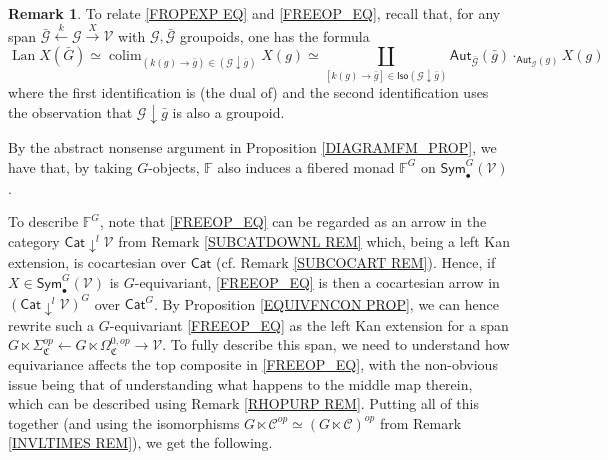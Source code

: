 \documentclass[a4paper,10pt
,draft
]{article}%
\numberwithin{equation}{section}
\numberwithin{figure}{section}
\theoremstyle{definition} %
\newtheorem{remark}[equation]{Remark}%
\DeclareMathOperator{\colim}{colim}%
\DeclareMathOperator{\Lan}{Lan}%
\newcommand{\V}{\ensuremath{\mathcal V}}
\newcommand{\1}{\ensuremath{\mathbbm 1}}%
\begin{document}
\begin{remark}\label{CONVER REM}
	To relate \eqref{FROPEXP EQ} and \eqref{FREEOP_EQ}, recall that, 
	for any span 
	$\bar{\mathcal{G}} \overset{k}{\leftarrow} \mathcal{G} \xrightarrow{X} \mathcal{V}$
	with $\mathcal{G},\bar{\mathcal{G}}$ groupoids,
	one has the formula
	\[\Lan X (\bar{G}) \simeq 
	\colim_{(k(g) \to \bar{g})\in (\mathcal{G} \downarrow \bar{g})} X(g) \simeq
	\coprod_{[k(g) \to \bar{g}] 
		\in \mathsf{Iso}(\mathcal{G} \downarrow \bar{g})}
	\mathsf{Aut}_{\bar{\mathcal{G}}}(\bar{g})
	\cdot_{\mathsf{Aut}_{\mathcal{G}}(g)}
	X(g)
	\]
	where the first identification is
	(the dual of) \cite[Thm. 1.3.5]{Ri14}
	and the second identification uses the observation that
	$\mathcal{G} \downarrow \bar{g}$ is also a groupoid.
\end{remark}


By the abstract nonsense argument in 
Proposition \ref{DIAGRAMFM_PROP},
we have that, by taking $G$-objects, 
$\mathbb{F}$ also induces a fibered monad 
$\mathbb{F}^G$ on $\mathsf{Sym}^G_{\bullet}(\V)$.

To describe $\mathbb{F}^G$,
note that \eqref{FREEOP_EQ}
can be regarded as an arrow in 
the category $\mathsf{Cat} \downarrow^l \V$
from Remark \ref{SUBCATDOWNL REM}
which, being a left Kan extension, is cocartesian over $\mathsf{Cat}$ (cf. Remark \ref{SUBCOCART REM}).
Hence, if $X \in \mathsf{Sym}_{\bullet}^G(\V)$
is $G$-equivariant, 
\eqref{FREEOP_EQ} is then a cocartesian arrow in 
$\left(\mathsf{Cat} \downarrow^l \V\right)^G$
over $\mathsf{Cat}^G$.
By Proposition \ref{EQUIVFNCON PROP},
we can hence rewrite 
such a $G$-equivariant \eqref{FREEOP_EQ}
as the left Kan extension for a span
$G \ltimes \Sigma^{op}_{\mathfrak{C}}
\leftarrow 
G \ltimes \Omega^{0,op}_{\mathfrak{C}}
\to 
\V$.
To fully describe this span,
we need to understand how equivariance 
affects the top composite in \eqref{FREEOP_EQ},
with the non-obvious issue being that of understanding
what happens to the middle map
therein, which can be described using
Remark \ref{RHOPURP REM}.
Putting all of this together
(and using the isomorphisms
$G \ltimes \mathcal{C}^{op} \simeq (G \ltimes \mathcal{C})^{op}$
from Remark \ref{INVLTIMES REM}),
we get the following.
\end{document}
